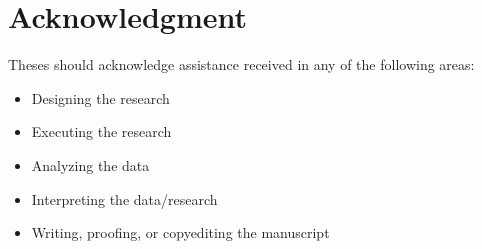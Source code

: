 \chapter*{Acknowledgment} 
Theses should acknowledge assistance received in any of the following areas:

\begin{itemize}
\item Designing the research
\item Executing the research
\item Analyzing the data
\item Interpreting the data/research
\item Writing, proofing, or copyediting the manuscript 
\end{itemize}
